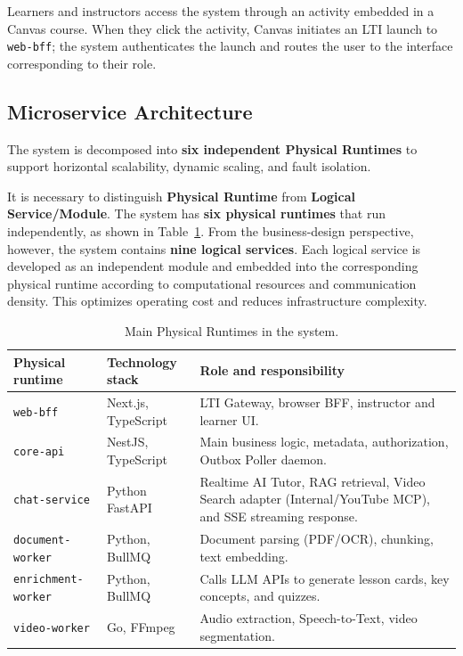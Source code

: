 Learners and instructors access the system through an activity embedded in
a Canvas course. When they click the activity, Canvas initiates an LTI
launch to \texttt{web-bff}; the system authenticates the launch and routes
the user to the interface corresponding to their role.

\subsection{Microservice Architecture}

The system is decomposed into \textbf{six independent Physical Runtimes}
to support horizontal scalability, dynamic scaling, and fault isolation.

It is necessary to distinguish \textbf{Physical Runtime} from
\textbf{Logical Service/Module}. The system has \textbf{six physical
runtimes} that run independently, as shown in Table~\ref{tab:runtimes}.
From the business-design perspective, however, the system contains
\textbf{nine logical services}. Each logical service is developed as an
independent module and embedded into the corresponding physical runtime
according to computational resources and communication density. This
optimizes operating cost and reduces infrastructure complexity.

\begin{table}[H]
    \centering
    \caption{Main Physical Runtimes in the system.}
    \label{tab:runtimes}
    \begin{tabular}{|p{4.4cm}|p{3cm}|p{6.6cm}|}
        \hline
        \textbf{Physical runtime} & \textbf{Technology stack} & \textbf{Role and responsibility} \\
        \hline
        \texttt{web-bff}
            & Next.js, TypeScript
            & LTI Gateway, browser BFF, instructor and learner UI. \\
        \hline
        \texttt{core-api}
            & NestJS, TypeScript
            & Main business logic, metadata, authorization, Outbox Poller daemon. \\
        \hline
        \texttt{chat-service}
            & Python FastAPI
            & Realtime AI Tutor, RAG retrieval, Video Search adapter (Internal/YouTube MCP), and SSE streaming response. \\
        \hline
        \texttt{document-worker}
            & Python, BullMQ
            & Document parsing (PDF/OCR), chunking, text embedding. \\
        \hline
        \texttt{enrichment-worker}
            & Python, BullMQ
            & Calls LLM APIs to generate lesson cards, key concepts, and quizzes. \\
        \hline
        \texttt{video-worker}
            & Go, FFmpeg
            & Audio extraction, Speech-to-Text, video segmentation. \\
        \hline
    \end{tabular}
\end{table}

